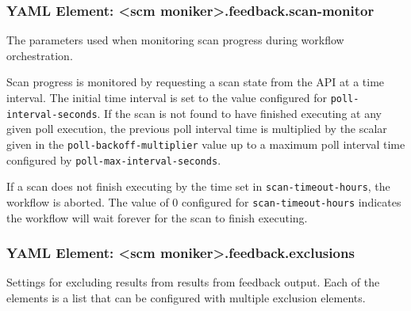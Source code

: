 \subsubsection{YAML Element: <scm moniker>.feedback.scan-monitor}\label{sec:yaml-feedback-scan-monitor}
The parameters used when monitoring scan progress during workflow orchestration. 

Scan progress is monitored by requesting a scan state from the \cxone API at
a time interval.  The initial time interval is set to the value configured for
\texttt{poll-interval-seconds}.  If the scan is not found to have finished executing
at any given poll execution, the previous poll interval time is multiplied by
the scalar given in the \texttt{poll-backoff-multiplier} value up to a maximum
poll interval time configured by \texttt{poll-max-interval-seconds}.

If a scan does not finish executing by the time set in \texttt{scan-timeout-hours}, the
workflow is aborted.  The value of 0 configured for \texttt{scan-timeout-hours} indicates
the workflow will wait forever for the scan to finish executing.

\subsubsection{YAML Element: <scm moniker>.feedback.exclusions}\label{sec:yaml-feedback-exclusions}
Settings for excluding results from results from feedback output.  Each of the elements is a list that 
can be configured with multiple exclusion elements.
